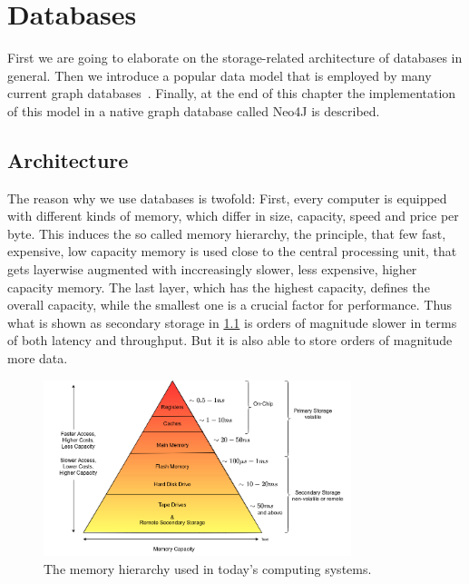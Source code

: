 \chapter{Databases}
First we are going to elaborate on the storage-related architecture of databases in general.
    Then we introduce a popular data model that is employed by many current graph databases~\autocite{GitHubneo4j, ArangoDB, AmazonNeptune, RedisGraph}.
    Finally, at the end of this chapter the implementation of this model in a native graph database called Neo4J is described.
    
\section{Architecture}\label{db-arch}
    The reason why we use databases is twofold:
    First, every computer is equipped with different kinds of memory, which differ in size, capacity, speed and price per byte. 
    This induces the so called memory hierarchy, the principle, that few fast, expensive, low capacity memory is used close to the central processing unit, that gets layerwise augmented with inccreasingly slower, less expensive, higher capacity memory. 
    The last layer, which has the highest capacity, defines the overall capacity, while the smallest one is a crucial factor for performance.
    Thus what is shown as secondary storage in \ref{mem-hier} is orders of magnitude slower in terms of both latency and throughput.
    But it is also able to store orders of magnitude more data. 
    \begin{figure}[htp]
        \begin{center}
        \includegraphics[keepaspectratio,width=0.8\textwidth]{img/03-preliminaries/mem-hierarch.png}
        \end{center}
        \caption{The memory hierarchy used in today's computing systems.} 
        \label{mem-hier}
    \end{figure}
